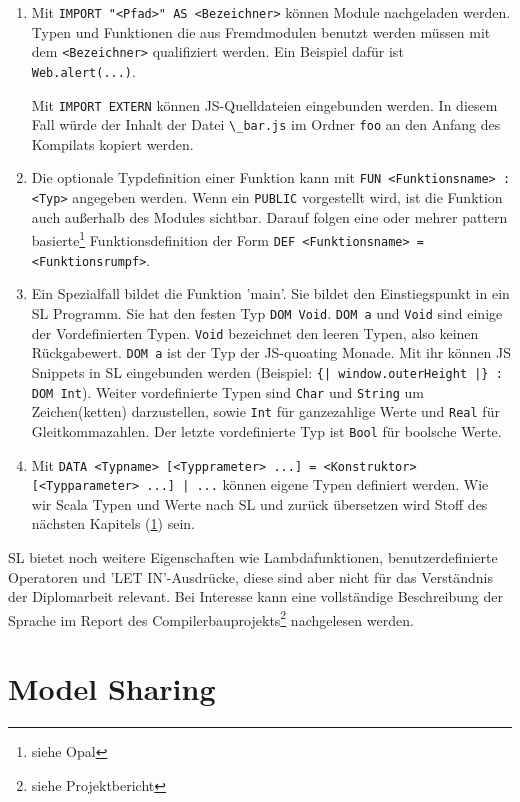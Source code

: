 \documentclass[12pt]{scrreprt}
\begin{document}
\begin{enumerate}
  \item Mit \lstinline!IMPORT "<Pfad>" AS <Bezeichner>! können Module nachgeladen werden. Typen und Funktionen die aus Fremdmodulen benutzt werden müssen mit dem \lstinline!<Bezeichner>! qualifiziert werden. Ein Beispiel dafür ist \lstinline!Web.alert(...)!. 
  
  Mit \lstinline!IMPORT EXTERN! können \ac{JS}-Quelldateien eingebunden werden. In diesem Fall würde der Inhalt der Datei \lstinline!\_bar.js! im Ordner \lstinline!foo! an den Anfang des Kompilats kopiert werden.
  \item Die optionale Typdefinition einer Funktion kann mit \lstinline!FUN <Funktionsname> : <Typ>! angegeben werden. Wenn ein \lstinline!PUBLIC! vorgestellt wird, ist die Funktion auch außerhalb des Modules sichtbar. Darauf folgen eine oder mehrer pattern basierte\footnote{siehe Opal} Funktionsdefinition der Form \lstinline!DEF <Funktionsname> = <Funktionsrumpf>!.
  \item Ein Spezialfall bildet die Funktion 'main'. Sie bildet den Einstiegspunkt in ein \ac{SL} Programm. Sie hat den festen Typ \lstinline!DOM Void!. \lstinline!DOM a! und \lstinline!Void! sind einige der Vordefinierten Typen. \lstinline!Void! bezeichnet den leeren Typen, also keinen Rückgabewert. \lstinline!DOM a! ist der Typ der \ac{JS}-quoating Monade. Mit ihr können \ac{JS} Snippets in \ac{SL} eingebunden werden (Beispiel: \lstinline!{| window.outerHeight |} : DOM Int!). Weiter vordefinierte Typen sind \lstinline!Char! und \lstinline!String! um Zeichen(ketten) darzustellen, sowie \lstinline!Int! für ganzezahlige Werte und \lstinline!Real! für Gleitkommazahlen. Der letzte vordefinierte Typ ist \lstinline!Bool! für boolsche Werte.
  \item Mit \lstinline!DATA <Typname> [<Typprameter> ...] = <Konstruktor> [<Typparameter> ...] | ...! können eigene Typen definiert werden. Wie wir Scala Typen und Werte nach \ac{SL} und zurück übersetzen wird Stoff des nächsten Kapitels (\ref{cha:model-sharing}) sein.
\end{enumerate}

\ac{SL} bietet noch weitere Eigenschaften wie Lambdafunktionen, benutzerdefinierte Operatoren und 'LET IN'-Ausdrücke, diese sind aber nicht für das Verständnis der Diplomarbeit relevant. Bei Interesse kann eine vollständige Beschreibung der Sprache im Report des Compilerbauprojekts\footnote{siehe Projektbericht} nachgelesen werden.

\chapter{Model Sharing}
\label{cha:model-sharing}
\end{document}

